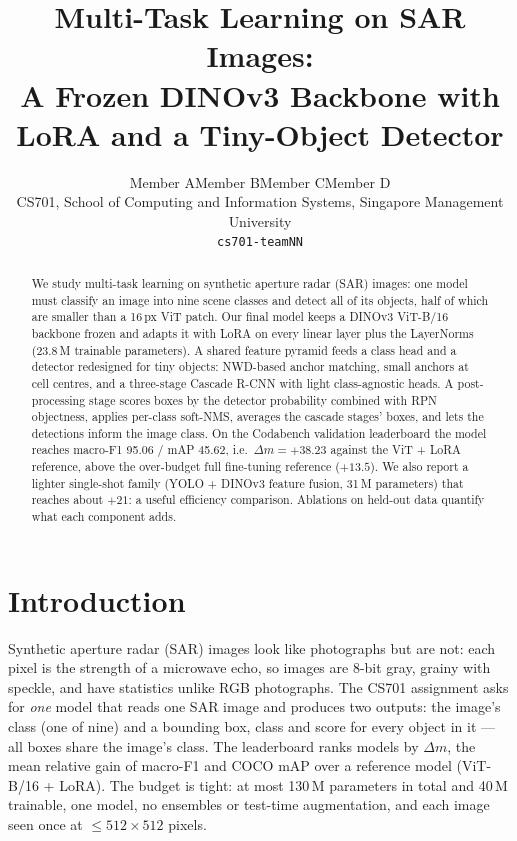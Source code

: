 \documentclass[10pt,twocolumn,letterpaper]{article}
\title{Multi-Task Learning on SAR Images:\\A Frozen DINOv3 Backbone with LoRA and a Tiny-Object Detector}
\author{Member A\quad Member B\quad Member C\quad Member D\\
CS701, School of Computing and Information Systems, Singapore Management University\\
{\tt\small cs701-teamNN}
}
\newcommand{\dm}{\ensuremath{\Delta m}}
\begin{document}
\maketitle

\begin{abstract}
We study multi-task learning on synthetic aperture radar (SAR) images: one model
must classify an image into nine scene classes and detect all of its objects,
half of which are smaller than a 16\,px ViT patch. Our final model keeps a
DINOv3 ViT-B/16 backbone frozen and adapts it with LoRA on every linear layer
plus the LayerNorms (23.8\,M trainable parameters). A shared feature pyramid
feeds a class head and a detector redesigned for tiny objects: NWD-based anchor
matching, small anchors at cell centres, and a three-stage Cascade R-CNN with
light class-agnostic heads. A post-processing stage scores boxes by the
detector probability combined with RPN objectness, applies per-class soft-NMS,
averages the cascade stages' boxes, and lets the detections inform the image
class. On the Codabench validation leaderboard the model reaches
macro-F1 95.06 / mAP 45.62, i.e.\ $\dm = +38.23$ against the ViT + LoRA
reference, above the over-budget full fine-tuning reference ($+13.5$). We also
report a lighter single-shot family (YOLO + DINOv3 feature fusion, 31\,M
parameters) that reaches about $+21$: a useful efficiency comparison.
Ablations on held-out data quantify what each component adds.
\end{abstract}

\section{Introduction}
\label{sec:intro}

Synthetic aperture radar (SAR) images look like photographs but are not:
each pixel is the strength of a microwave echo, so images are 8-bit gray,
grainy with speckle, and have statistics unlike RGB photographs. The CS701
assignment asks for \emph{one} model that reads one SAR image and produces
two outputs: the image's class (one of nine) and a bounding box, class and
score for every object in it --- all boxes share the image's class. The
leaderboard ranks models by \dm, the mean relative gain of macro-F1 and COCO
mAP over a reference model (ViT-B/16 + LoRA). The budget is tight: at most
130\,M parameters in total and 40\,M trainable, one model, no ensembles or
test-time augmentation, and each image seen once at $\le 512\times512$ pixels.
\end{document}
